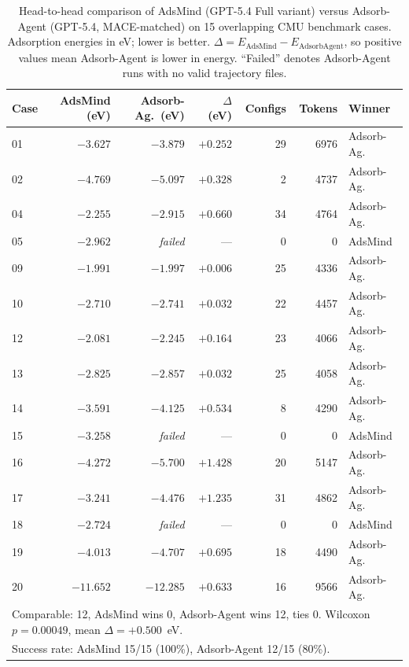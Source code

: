 \begin{table}[h]
\centering
\small
\caption{Head-to-head comparison of AdsMind (GPT-5.4 Full variant) versus Adsorb-Agent (GPT-5.4, MACE-matched) on 15 overlapping CMU benchmark cases. Adsorption energies in eV; lower is better. $\Delta = E_{\mathrm{AdsMind}} - E_{\mathrm{AdsorbAgent}}$, so positive values mean Adsorb-Agent is lower in energy. ``Failed'' denotes Adsorb-Agent runs with no valid trajectory files.}
\label{tab:si-adsorbagent-comparison}
\begin{tabular}{lrrrrrl}
\toprule
Case & AdsMind (eV) & Adsorb-Ag.\ (eV) & $\Delta$ (eV) & Configs & Tokens & Winner \\
\midrule
  01 & $-3.627$ & $-3.879$ & $+0.252$ & 29 & 6976 & Adsorb-Ag. \\
  02 & $-4.769$ & $-5.097$ & $+0.328$ & 2 & 4737 & Adsorb-Ag. \\
  04 & $-2.255$ & $-2.915$ & $+0.660$ & 34 & 4764 & Adsorb-Ag. \\
  05 & $-2.962$ & \textit{failed} & --- & 0 & 0 & AdsMind \\
  09 & $-1.991$ & $-1.997$ & $+0.006$ & 25 & 4336 & Adsorb-Ag. \\
  10 & $-2.710$ & $-2.741$ & $+0.032$ & 22 & 4457 & Adsorb-Ag. \\
  12 & $-2.081$ & $-2.245$ & $+0.164$ & 23 & 4066 & Adsorb-Ag. \\
  13 & $-2.825$ & $-2.857$ & $+0.032$ & 25 & 4058 & Adsorb-Ag. \\
  14 & $-3.591$ & $-4.125$ & $+0.534$ & 8 & 4290 & Adsorb-Ag. \\
  15 & $-3.258$ & \textit{failed} & --- & 0 & 0 & AdsMind \\
  16 & $-4.272$ & $-5.700$ & $+1.428$ & 20 & 5147 & Adsorb-Ag. \\
  17 & $-3.241$ & $-4.476$ & $+1.235$ & 31 & 4862 & Adsorb-Ag. \\
  18 & $-2.724$ & \textit{failed} & --- & 0 & 0 & AdsMind \\
  19 & $-4.013$ & $-4.707$ & $+0.695$ & 18 & 4490 & Adsorb-Ag. \\
  20 & $-11.652$ & $-12.285$ & $+0.633$ & 16 & 9566 & Adsorb-Ag. \\
\midrule
  \multicolumn{7}{l}{Comparable: 12, AdsMind wins 0, Adsorb-Agent wins 12, ties 0. Wilcoxon $p = 0.00049$, mean $\Delta = +0.500$~eV.} \\
  \multicolumn{7}{l}{Success rate: AdsMind 15/15 (100\%), Adsorb-Agent 12/15 (80\%).} \\
\bottomrule
\end{tabular}
\end{table}
